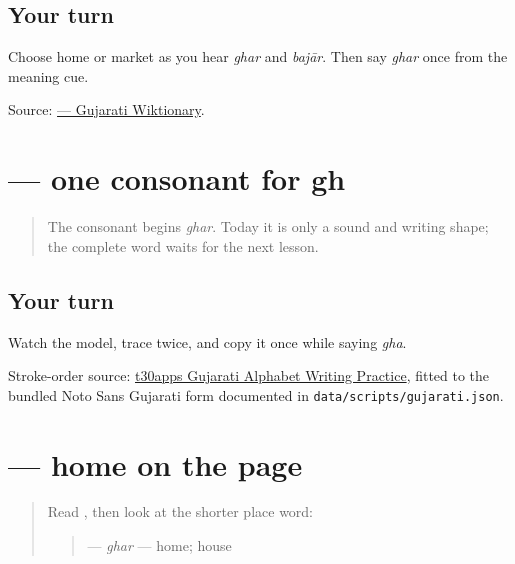 \subsection*{Your turn}
Choose home or market as you hear \emph{ghar} and \emph{bajār}. Then say \emph{ghar} once from the meaning cue.

\begin{tcolorbox}[breakable,colback=teal!4,colframe=teal!35!black,title={Before you move on}]
Source: \href{https://gu.wiktionary.org/wiki/\%E0\%AA\%98\%E0\%AA\%B0}{ — Gujarati Wiktionary}.
\end{tcolorbox}
\section[\texorpdfstring{\gu{ઘ} (gha)}{ઘ (gha)}]{ — one consonant for gh}

\label{lesson:GU-W20-gha}



\begin{quote}
The consonant \textbf{} begins \emph{ghar}. Today it is only a sound and writing shape; the complete word waits for the next lesson.
\end{quote}

\subsection*{Your turn}

Watch the model, trace \textbf{} twice, and copy it once while saying \emph{gha}.

\begin{tcolorbox}[breakable,colback=teal!4,colframe=teal!35!black,title={Before you move on}]
Stroke-order source: \href{https://www.t30apps.com/gujarati-alphabet-writing/}{t30apps Gujarati Alphabet Writing Practice}, fitted to the bundled Noto Sans Gujarati form documented in \texttt{data/scripts/gujarati.json}.
\end{tcolorbox}
\section[\texorpdfstring{\gu{ઘર} (ghar)}{ઘર (ghar)}]{ — home on the page}

\label{lesson:GU-C20-ghar}



\begin{quote}
Read \textbf{}, then look at the shorter place word:

\begin{quote}
\textbf{} — \emph{ghar} — home; house
\end{quote}
\end{quote}

